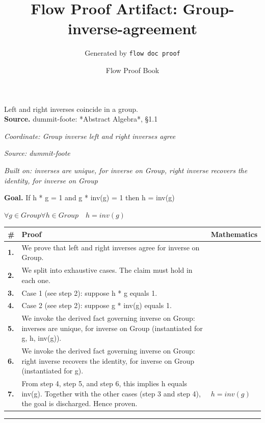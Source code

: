\documentclass[11pt]{article}
\title{Flow Proof Artifact: Group-inverse-agreement}
\author{Generated by \texttt{flow doc proof}}
\date{Flow Proof Book}
\theoremstyle{definition}
\begin{document}
\maketitle
Left and right inverses coincide in a group.\\[0.5em]
\textbf{Source.} dummit-foote: *Abstract Algebra*, §1.1\\[0.5em]
\bigskip
{}\par
\smallskip\noindent\textit{Coordinate: Group \cdot inverse \cdot left and right inverses agree}\par
\smallskip\noindent\textit{Source: dummit-foote}\par
\smallskip\noindent\textit{Built on: inverses are unique, for inverse on Group, right inverse recovers the identity, for inverse on Group}\par
\medskip
\noindent\textbf{Goal.} If h * g = 1 and g * inv(g) = 1 then h = inv(g)\par
\noindent$\displaystyle \forall g \in Group \forall h \in Group\quad h = inv(g)$\par
\medskip
\noindent
\begin{tabular}{@{} >{\raggedright\arraybackslash}p{} >{\raggedright\arraybackslash}p{} >{\raggedleft\arraybackslash}p{} @{}}
\textbf{\#} & \textbf{Proof} & \textbf{Mathematics} \\
\midrule
\textbf{1.} & We prove that left and right inverses agree for inverse on Group. & \\[0.45em]
\textbf{2.} & We split into exhaustive cases. The claim must hold in each one. & \\[0.45em]
\textbf{3.} & Case 1 (see step 2): suppose h * g  equals  1. & \\[0.45em]
\textbf{4.} & Case 2 (see step 2): suppose g * inv(g)  equals  1. & \\[0.45em]
\textbf{5.} & We invoke the derived fact governing inverse on Group: inverses are unique, for inverse on Group (instantiated for g, h, inv(g)). & \\[0.45em]
\textbf{6.} & We invoke the derived fact governing inverse on Group: right inverse recovers the identity, for inverse on Group (instantiated for g). & \\[0.45em]
\textbf{7.} & From step 4, step 5, and step 6, this implies h equals inv(g). Together with the other cases (step 3 and step 4), the goal is discharged. Hence proven. & $\displaystyle h = inv(g)$ \\[0.45em]
\bottomrule
\end{tabular}
\label{thm:Group-inverse-left_and_right_inverses_agree}
\par\medskip\hrule
\end{document}
